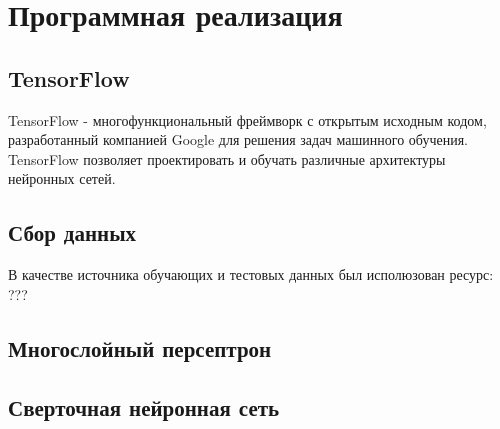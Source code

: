 \section{Программная реализация}

\subsection{TensorFlow}
TensorFlow - многофункциональный фреймворк с открытым исходным кодом, разработанный компанией Google для решения задач машинного обучения. TensorFlow позволяет проектировать и обучать различные архитектуры нейронных сетей.

\subsection{Сбор данных}
В качестве источника обучающих и тестовых данных был исполюзован ресурс: ???

\subsection{Многослойный персептрон}

\subsection{Сверточная нейронная сеть}


\clearpage